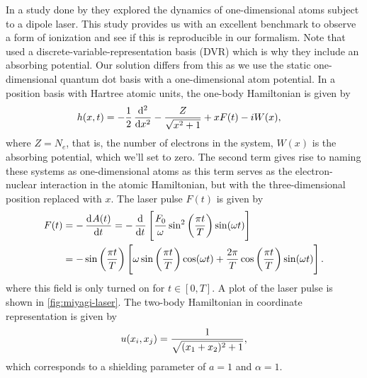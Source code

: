             In a study done by \citeauthor{miyagi_and_madsen}
            \cite{miyagi_and_madsen} they explored the dynamics of
            one-dimensional atoms subject to a dipole laser.
            This study provides us with an excellent benchmark to observe a form
            of ionization and see if this is reproducible in our formalism.
            Note that \citeauthor{miyagi_and_madsen} used a
            discrete-variable-representation basis (DVR) which is why they
            include an absorbing potential.
            Our solution differs from this as we use the static one-dimensional
            quantum dot basis with a one-dimensional atom potential.
            In a position basis with Hartree atomic units, the one-body
            Hamiltonian is given by \cite{miyagi_and_madsen}
            \begin{align}
                \oneten(x, t)
                &= -\half \dod[2]{}{x}
                - \frac{Z}{\sqrt{x^2 + 1}}
                + xF(t)
                - iW(x),
            \end{align}
            where $Z = N_e$, that is, the number of electrons in the system,
            $W(x)$ is the absorbing potential, which we'll set to zero.
            The second term gives rise to naming these systems as
            one-dimensional atoms as this term serves as the electron-nuclear
            interaction in the atomic Hamiltonian, but with the
            three-dimensional position replaced with $x$.
            The laser pulse $F(t)$ is given by \cite{miyagi_and_madsen}
            \begin{align}
                F(t)
                &= -\dod[]{A(t)}{t}
                = -\dod[]{}{t}\brak{
                    \frac{F_0}{\omega}
                    \sin^2\para{\frac{\pi t}{T}}
                    \sin(\omega t)
                }
                \\
                &=
                -\sin\para{\frac{\pi t}{T}}\brak{
                    \omega \sin\para{\frac{\pi t}{T}}
                    \cos(\omega t)
                    + \frac{2\pi}{T}
                    \cos\para{\frac{\pi t}{T}}
                    \sin(\omega t)
                }.
                \label{eq:miyagi-laser}
            \end{align}
            where this field is only turned on for $t \in [0, T]$.
            A plot of the laser pulse is shown in \autoref{fig:miyagi-laser}.
            The two-body Hamiltonian in coordinate representation is given by
            \begin{align}
                u(x_i, x_j) = \frac{1}{\sqrt{(x_1 + x_2)^2 + 1}},
            \end{align}
            which corresponds to a shielding parameter of $a = 1$ and $\alpha =
            1$.

